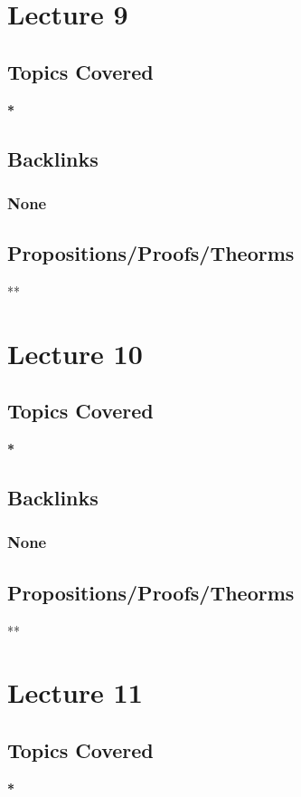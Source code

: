 \documentclass[11pt]{article}
\begin{document}
\section*{Lecture 9}
\label{sec:orge5887c5}
\subsection*{Topics Covered}
\label{sec:org6199251}
\textbf{*}
\subsection*{Backlinks}
\label{sec:org57eb0a6}
\subsubsection*{None}
\label{sec:org6faed67}
\subsection*{Propositions/Proofs/Theorms}
\label{sec:org79f9caf}
**

\section*{Lecture 10}
\label{sec:org1eeb579}
\subsection*{Topics Covered}
\label{sec:org81bac42}
\textbf{*}
\subsection*{Backlinks}
\label{sec:orgaf7c3ff}
\subsubsection*{None}
\label{sec:orga5d28f9}
\subsection*{Propositions/Proofs/Theorms}
\label{sec:org3cd0f12}
**

\section*{Lecture 11}
\label{sec:orge2cbb5e}
\subsection*{Topics Covered}
\label{sec:org5927739}
\textbf{*}
\end{document}
